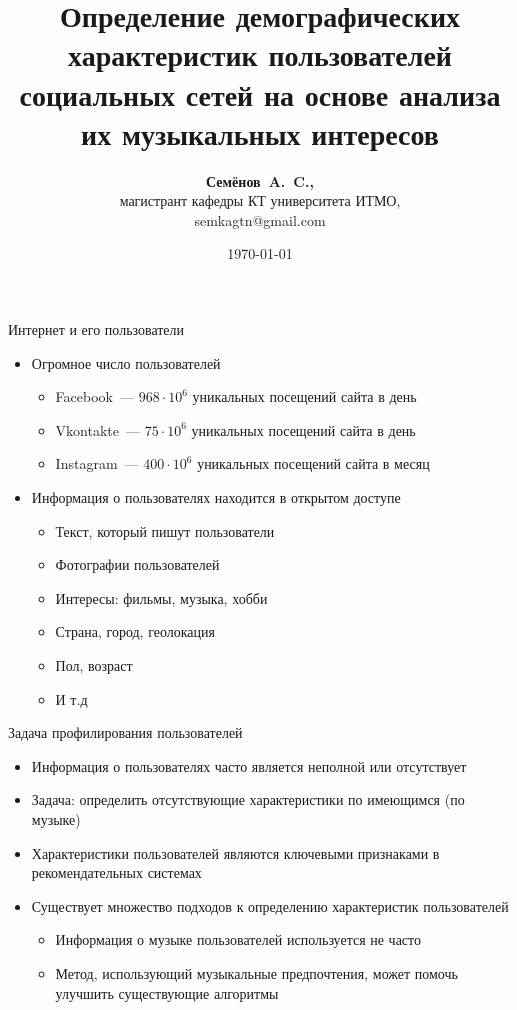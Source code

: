 \documentclass{beamer}
\title{Определение демографических характеристик пользователей
социальных сетей на основе анализа их музыкальных интересов}
\author{\textbf{Семёнов~A.~C.,} \\ 
    магистрант кафедры КТ университета ИТМО, \\
    semkagtn@gmail.com}
\institute{СПИСОК 2016}
\date{\today}
\begin{document}
\begin{frame}
  \titlepage
\end{frame}

\begin{frame}{Интернет и его пользователи}
  \begin{itemize}
      \item {Огромное число пользователей}
          \begin{itemize}
              \item {Facebook~--- $968 \cdot 10^{6}$ уникальных посещений сайта в день}
              \item {Vkontakte~--- $75 \cdot 10^{6}$ уникальных посещений сайта в день}
              \item {Instagram~--- $400 \cdot 10^{6}$ уникальных посещений сайта в месяц}
          \end{itemize}
      \item {Информация о пользователях находится в открытом доступе}
          \begin{itemize}
              \item {Текст, который пишут пользователи}
              \item {Фотографии пользователей}
              \item {Интересы: фильмы, музыка, хобби}
              \item {Страна, город, геолокация}
              \item {Пол, возраст}
              \item {И т.д}
          \end{itemize}
  \end{itemize}
\end{frame}

\begin{frame}{Задача профилирования пользователей}
  \begin{itemize}
      \item {Информация о пользователях часто является неполной или отсутствует}
      \item {Задача: определить отсутствующие характеристики по имеющимся (по музыке)}
      \item {Характеристики пользователей являются ключевыми признаками в рекомендательных системах}
      \item {Существует множество подходов к определению характеристик пользователей}
          \begin{itemize}
              \item {Информация о музыке пользователей используется не часто}
              \item {Метод, использующий музыкальные предпочтения, может помочь улучшить существующие алгоритмы}
          \end{itemize}
  \end{itemize}
\end{frame}
\end{document}
